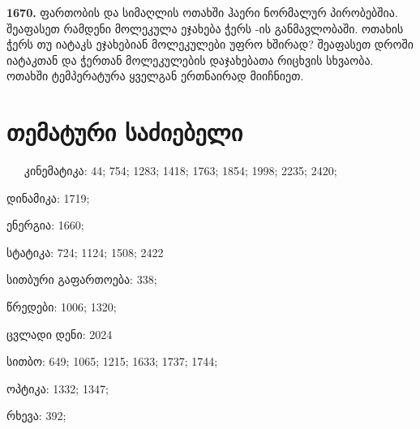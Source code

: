 \documentclass[12pt,a4paper,]{report}
\begin{document}
\textbf{1670.} ფართობის და   სიმაღლის ოთახში ჰაერი ნორმალურ პირობებშია. შეაფასეთ რამდენი მოლეკულა ეჯახება ჭერს  -ის განმავლობაში. ოთახის ჭერს თუ იატაკს ეჯახებიან მოლეკულები უფრო ხშირად? შეაფასეთ   დროში იატაკთან და ჭერთან მოლეკულების დაჯახებათა რიცხვის სხვაობა. ოთახში ტემპერატურა ყველგან ერთნაირად მიიჩნიეთ.





\chapter{თემატური საძიებელი}

$\ \quad$ კინემატიკა: 44; 754; 1283; 1418; 1763; 1854; 1998; 2235; 2420;

დინამიკა: 1719; 

ენერგია: 1660;

სტატიკა: 724; 1124; 1508; 2422

სითბური გაფართოება: 338;

წრედები: 1006; 1320;

ცვლადი დენი: 2024

სითბო: 649; 1065; 1215; 1633; 1737; 1744; 

ოპტიკა: 1332; 1347;

რხევა: 392;
\end{document}
